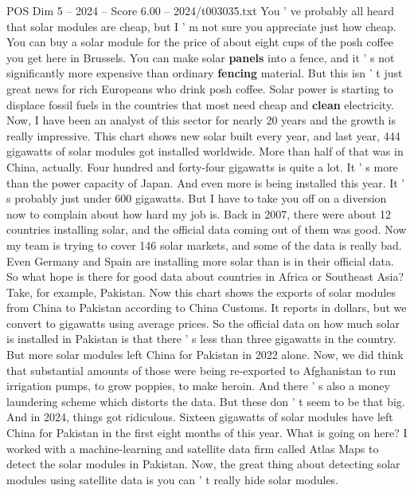 \begin{textsample}{POS Dim 5 – 2024 – Score 6.00 – 2024/t003035.txt}  \label{ex:f5_pos_069}
You ' ve probably all heard that solar modules are cheap, but I ' m not sure you appreciate just how cheap.
You can buy a solar module for the price of about eight cups of the posh coffee you get here in Brussels.
You can make solar \textbf{panels} into a fence, and it ' s not significantly more expensive than ordinary \textbf{fencing} material.
But this isn ' t just great news for rich Europeans who drink posh coffee.
Solar power is starting to displace fossil fuels in the countries that most need cheap and \textbf{clean} electricity.
Now, I have been an analyst of this sector for nearly 20 years and the growth is really impressive.
This chart shows new solar built every year, and last year, 444 gigawatts of solar modules got installed worldwide.
More than half of that was in China, actually.
Four hundred and forty-four gigawatts is quite a lot.
It ' s more than the power capacity of Japan.
And even more is being installed this year.
It ' s probably just under 600 gigawatts.
But I have to take you off on a diversion now to complain about how hard my job is.
Back in 2007, there were about 12 countries installing solar, and the official data coming out of them was good.
Now my team is trying to cover 146 solar markets, and some of the data is really bad.
Even Germany and Spain are installing more solar than is in their official data.
So what hope is there for good data about countries in Africa or Southeast Asia?
Take, for example, Pakistan.
Now this chart shows the exports of solar modules from China to Pakistan according to China Customs.
It reports in dollars, but we convert to gigawatts using average prices.
So the official data on how much solar is installed in Pakistan is that there ' s less than three gigawatts in the country.
But more solar modules left China for Pakistan in 2022 alone.
Now, we did think that substantial amounts of those were being re-exported to Afghanistan to run irrigation pumps, to grow poppies, to make heroin.
And there ' s also a money laundering scheme which distorts the data.
But these don ' t seem to be that big.
And in 2024, things got ridiculous.
Sixteen gigawatts of solar modules have left China for Pakistan in the first eight months of this year.
What is going on here?
I worked with a machine-learning and satellite data firm called Atlas Maps to detect the solar modules in Pakistan.
Now, the great thing about detecting solar modules using satellite data is you can ' t really hide solar modules.

\end{textsample}
